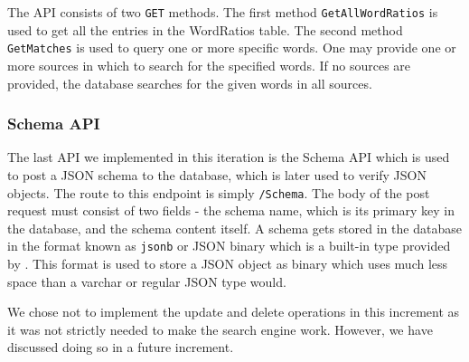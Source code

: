 The API consists of two \texttt{GET} methods. 
The first method \texttt{GetAllWordRatios} is used to get all the entries in the WordRatios table.
The second method \texttt{GetMatches} is used to query one or more specific words. 
One may provide one or more sources in which to search for the specified words.
If no sources are provided, the database searches for the given words in all sources.

\subsubsection{Schema API}

The last API we implemented in this iteration is the Schema API which is used to post a JSON schema to the database, which is later used to verify JSON objects.
The route to this endpoint is simply \texttt{/Schema}. 
The body of the post request must consist of two fields - the schema name, which is its primary key in the database, and the schema content itself. 
A schema gets stored in the database in the format known as \texttt{jsonb} or JSON binary which is a built-in type provided by \postgres{}.
This format is used to store a JSON object as binary which uses much less space than a varchar or regular JSON type would.


We chose not to implement the update and delete operations in this increment as it was not strictly needed to make the search engine work.
However, we have discussed doing so in a future increment.